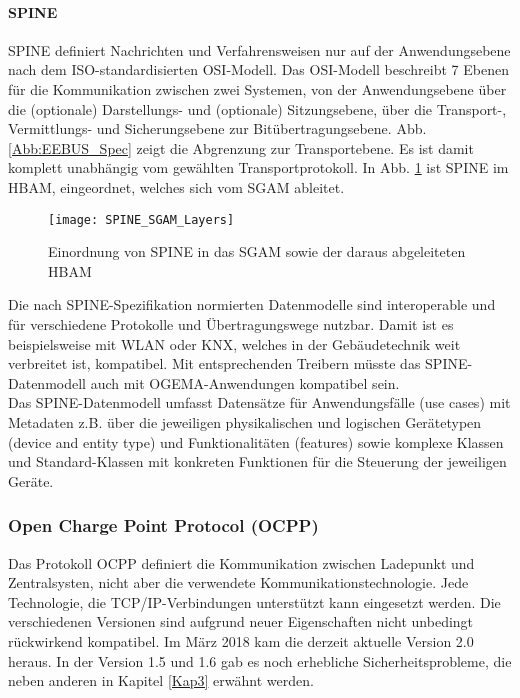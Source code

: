 				\paragraph{SPINE}
				\ac{SPINE} definiert Nachrichten und Verfahrensweisen nur auf der Anwendungsebene nach dem ISO-standardisierten \ac{OSI-Modell}. Das OSI-Modell beschreibt 7 Ebenen für die Kommunikation zwischen zwei Systemen, von der Anwendungsebene über die (optionale) Darstellungs- und (optionale) Sitzungsebene, über die Transport-, Vermittlungs- und Sicherungsebene zur Bitübertragungsebene. Abb. \ref{Abb:EEBUS_Spec} zeigt die Abgrenzung zur Transportebene. Es ist damit komplett unabhängig vom gewählten Transportprotokoll. In Abb. \ref{Abb:SPINE_SGAM_Layers} ist SPINE im \ac{HBAM}, eingeordnet, welches sich vom \ac{SGAM} ableitet. \\
				
				\begin{figure}[h]
					\centering
					\texttt{[image: SPINE\_SGAM\_Layers]}
					\caption{Einordnung von SPINE in das \ac{SGAM} sowie der daraus abgeleiteten \ac{HBAM} \cite{EEBUS_Web}}
					\label{Abb:SPINE_SGAM_Layers}
				\end{figure}			
				
				Die nach SPINE-Spezifikation normierten Datenmodelle sind interoperable und für verschiedene Protokolle und Übertragungswege nutzbar. Damit ist es beispielsweise mit WLAN oder KNX, welches in der Gebäudetechnik weit verbreitet ist, kompatibel. Mit entsprechenden Treibern müsste das SPINE-Datenmodell auch mit OGEMA-Anwendungen kompatibel sein.\\
				
				Das SPINE-Datenmodell umfasst Datensätze für Anwendungsfälle (use cases) mit Metadaten z.B. über die jeweiligen physikalischen und logischen Gerätetypen (device and entity type) und Funktionalitäten (features) sowie komplexe Klassen und Standard-Klassen mit konkreten Funktionen für die Steuerung der jeweiligen Geräte. \cite{EEBUS_Intro} \\

			\subsubsection{Open Charge Point Protocol (OCPP)}
				Das Protokoll OCPP definiert die Kommunikation zwischen Ladepunkt und Zentralsysten, nicht aber die verwendete Kommunikationstechnologie. Jede Technologie, die TCP/IP-Verbindungen unterstützt kann eingesetzt werden. Die verschiedenen Versionen sind aufgrund neuer Eigenschaften nicht unbedingt rückwirkend kompatibel. Im März 2018 kam die derzeit aktuelle Version 2.0 heraus. In der Version 1.5 und 1.6 gab es noch erhebliche Sicherheitsprobleme, die neben anderen in Kapitel \ref{Kap3} erwähnt werden. \cite{CCC} \cite{evsim} 
	
